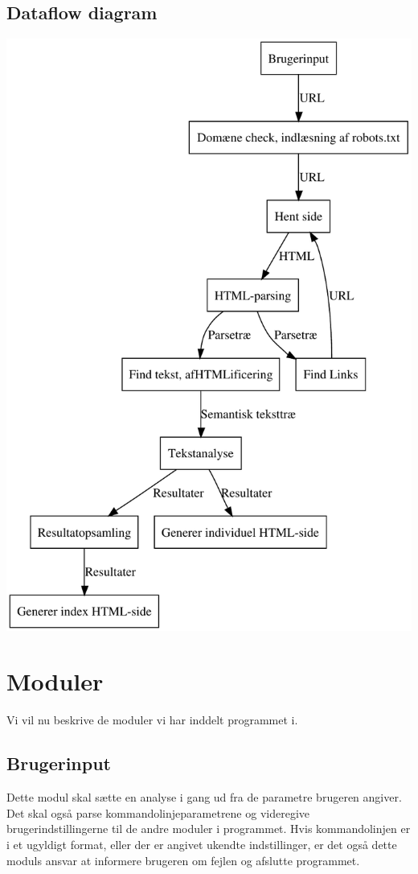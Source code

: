 \documentclass[a4paper,oneside,article, titlepage]{article}
\begin{document}
\subsection{Dataflow diagram}
\includegraphics{designill.pdf}


\section{Moduler}
Vi vil nu beskrive de moduler vi har inddelt programmet i.

\subsection{Brugerinput}
Dette modul skal sætte en analyse i gang ud fra de parametre brugeren
angiver. Det skal også parse kommandolinjeparametrene og videregive
brugerindstillingerne til de andre moduler i programmet. Hvis
kommandolinjen er i et ugyldigt format, eller der er angivet ukendte
indstillinger, er det også dette moduls ansvar at informere brugeren
om fejlen og afslutte programmet.
\end{document}
